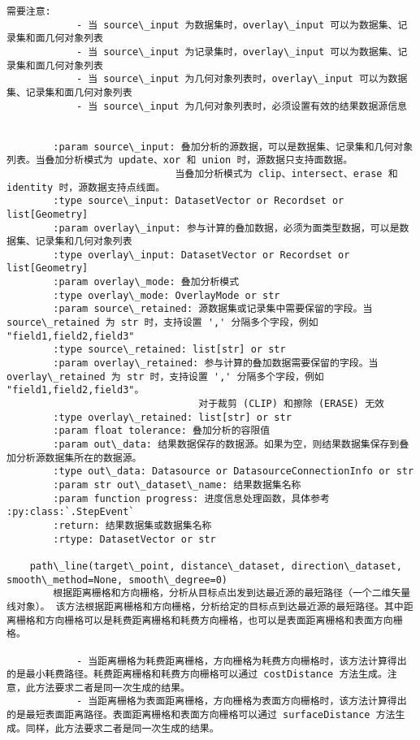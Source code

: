\documentclass[11pt]{article}
\begin{document}
\begin{Verbatim}[commandchars=\\\{\}]
        需要注意:
            - 当 source\_input 为数据集时，overlay\_input 可以为数据集、记录集和面几何对象列表
            - 当 source\_input 为记录集时，overlay\_input 可以为数据集、记录集和面几何对象列表
            - 当 source\_input 为几何对象列表时，overlay\_input 可以为数据集、记录集和面几何对象列表
            - 当 source\_input 为几何对象列表时，必须设置有效的结果数据源信息
        
        
        :param source\_input: 叠加分析的源数据，可以是数据集、记录集和几何对象列表。当叠加分析模式为 update、xor 和 union 时，源数据只支持面数据。
                             当叠加分析模式为 clip、intersect、erase 和 identity 时，源数据支持点线面。
        :type source\_input: DatasetVector or Recordset or list[Geometry]
        :param overlay\_input: 参与计算的叠加数据，必须为面类型数据，可以是数据集、记录集和几何对象列表
        :type overlay\_input: DatasetVector or Recordset or list[Geometry]
        :param overlay\_mode: 叠加分析模式
        :type overlay\_mode: OverlayMode or str
        :param source\_retained: 源数据集或记录集中需要保留的字段。当 source\_retained 为 str 时，支持设置 ',' 分隔多个字段，例如 "field1,field2,field3"
        :type source\_retained: list[str] or str
        :param overlay\_retained: 参与计算的叠加数据需要保留的字段。当 overlay\_retained 为 str 时，支持设置 ',' 分隔多个字段，例如 "field1,field2,field3"。
                                 对于裁剪 (CLIP) 和擦除 (ERASE) 无效
        :type overlay\_retained: list[str] or str
        :param float tolerance: 叠加分析的容限值
        :param out\_data: 结果数据保存的数据源。如果为空，则结果数据集保存到叠加分析源数据集所在的数据源。
        :type out\_data: Datasource or DatasourceConnectionInfo or str
        :param str out\_dataset\_name: 结果数据集名称
        :param function progress: 进度信息处理函数，具体参考 :py:class:`.StepEvent`
        :return: 结果数据集或数据集名称
        :rtype: DatasetVector or str
    
    path\_line(target\_point, distance\_dataset, direction\_dataset, smooth\_method=None, smooth\_degree=0)
        根据距离栅格和方向栅格，分析从目标点出发到达最近源的最短路径（一个二维矢量线对象）。 该方法根据距离栅格和方向栅格，分析给定的目标点到达最近源的最短路径。其中距离栅格和方向栅格可以是耗费距离栅格和耗费方向栅格，也可以是表面距离栅格和表面方向栅格。
        
            - 当距离栅格为耗费距离栅格，方向栅格为耗费方向栅格时，该方法计算得出的是最小耗费路径。耗费距离栅格和耗费方向栅格可以通过 costDistance 方法生成。注意，此方法要求二者是同一次生成的结果。
            - 当距离栅格为表面距离栅格，方向栅格为表面方向栅格时，该方法计算得出的是最短表面距离路径。表面距离栅格和表面方向栅格可以通过 surfaceDistance 方法生成。同样，此方法要求二者是同一次生成的结果。
        

\end{Verbatim}
\end{document}
